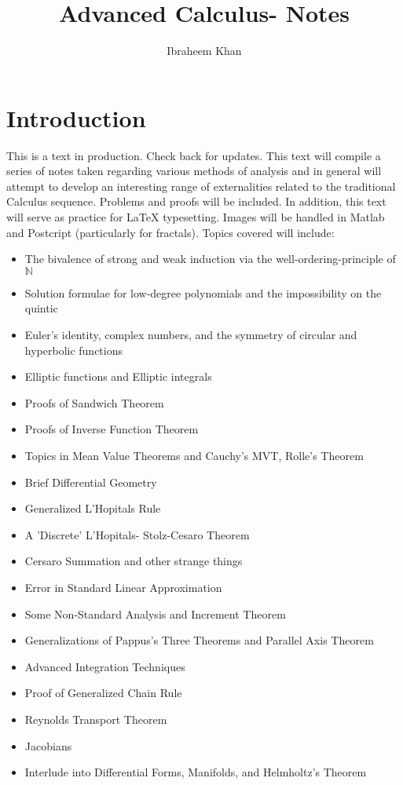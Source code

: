 \documentclass{article}
\title{Advanced Calculus- Notes}
\author{Ibraheem Khan}
\begin{document}
\maketitle{}
\section{Introduction}
This is a text in production. Check back for updates. This text will compile a series of notes taken regarding various methods of analysis and in general will attempt to develop an interesting range of externalities related to the traditional Calculus sequence. Problems and proofs will be included. In addition, this text will serve as practice for LaTeX typesetting. Images will be handled in Matlab and Postcript (particularly for fractals).
Topics covered will include:
\begin{itemize}
 \item The bivalence of strong and weak induction via the well-ordering-principle of $\mathbb{N}$
  \item Solution formulae for low-degree polynomials and the impossibility on the quintic
  \item Euler's identity, complex numbers, and the symmetry of circular and hyperbolic functions
  \item Elliptic functions and Elliptic integrals
  \item Proofs of Sandwich Theorem
  \item Proofs of Inverse Function Theorem
  \item Topics in Mean Value Theorems and Cauchy's MVT, Rolle's Theorem
  \item Brief Differential Geometry
  \item Generalized L'Hopitals Rule
  \item A 'Discrete' L'Hopitals- Stolz-Cesaro Theorem
  \item Cersaro Summation and other strange things
  \item Error in Standard Linear Approximation
  \item Some Non-Standard Analysis and Increment Theorem
  \item Generalizations of Pappus's Three Theorems and Parallel Axis Theorem
  \item Advanced Integration Techniques
  \item Proof of Generalized Chain Rule
  \item Reynolds Transport Theorem
  \item Jacobians
  \item Interlude into Differential Forms, Manifolds, and Helmholtz's Theorem

\end{itemize}
\end{document}
